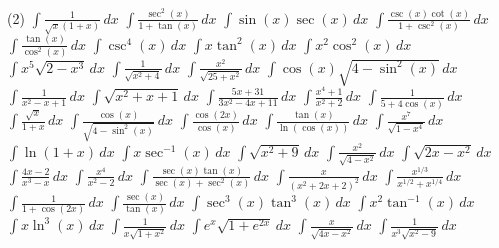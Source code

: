 \documentclass{article}
\begin{document}
\begin{tasks}[label=\arabic*., label-width=18pt](2)
  \task \( \displaystyle \int \frac{1}{\sqrt{x} (1 + x)} \, dx \)
  \task \( \displaystyle \int \frac{\sec^2(x)}{1 + \tan(x)} \, dx \)
  \task \( \displaystyle \int \sin(x) \sec(x) \, dx \)
  \task \( \displaystyle \int \frac{\csc(x) \cot(x)}{1 + \csc^2(x)} \, dx \)
  \task \( \displaystyle \int \frac{\tan(x)}{\cos^2(x)} \, dx \)
  \task \( \displaystyle \int \csc^4(x) \, dx \)
  \task \( \displaystyle \int x \tan^2(x) \, dx \)
  \task \( \displaystyle \int x^2 \cos^2(x) \, dx \)
  \task \( \displaystyle \int x^5 \sqrt{2 - x^3} \, dx \)
  \task \( \displaystyle \int \frac{1}{\sqrt{x^2 + 4}} \, dx \)
  \task \( \displaystyle \int \frac{x^2}{\sqrt{25 + x^2}} \, dx \)
  \task \( \displaystyle \int \cos(x) \sqrt{4 - \sin^2(x)} \, dx \)
  \task \( \displaystyle \int \frac{1}{x^2 - x + 1} \, dx \)
  \task \( \displaystyle \int \sqrt{x^2 + x + 1} \, dx \)
  \task \( \displaystyle \int \frac{5x + 31}{3x^2 - 4x + 11} \, dx \)
  \task \( \displaystyle \int \frac{x^4 + 1}{x^2 + 2} \, dx \)
  \task \( \displaystyle \int \frac{1}{5 + 4 \cos(x)} \, dx \)
  \task \( \displaystyle \int \frac{\sqrt{x}}{1 + x} \, dx \)
  \task \( \displaystyle \int \frac{\cos(x)}{\sqrt{4 - \sin^2(x)}} \, dx \)
  \task \( \displaystyle \int \frac{\cos(2x)}{\cos(x)} \, dx \)
  \task \( \displaystyle \int \frac{\tan(x)}{\ln(\cos(x))} \, dx \)
  \task \( \displaystyle \int \frac{x^7}{\sqrt{1 - x^4}} \, dx \)
  \task \( \displaystyle \int \ln(1 + x) \, dx \)
  \task \( \displaystyle \int x \sec^{-1}(x) \, dx \)
  \task \( \displaystyle \int \sqrt{x^2 + 9} \, dx \)
  \task \( \displaystyle \int \frac{x^2}{\sqrt{4 - x^2}} \, dx \)
  \task \( \displaystyle \int \sqrt{2x - x^2} \, dx \)
  \task \( \displaystyle \int \frac{4x - 2}{x^3 - x} \, dx \)
  \task \( \displaystyle \int \frac{x^4}{x^2 - 2} \, dx \)
  \task \( \displaystyle \int \frac{\sec(x) \tan(x)}{\sec(x) + \sec^2(x)} \, dx \)
  \task \( \displaystyle \int \frac{x}{(x^2 + 2x + 2)^2} \, dx \)
  \task \( \displaystyle \int \frac{x^{1/3}}{x^{1/2} + x^{1/4}} \, dx \)
  \task \( \displaystyle \int \frac{1}{1 + \cos(2x)} \, dx \)
  \task \( \displaystyle \int \frac{\sec(x)}{\tan(x)} \, dx \)
  \task \( \displaystyle \int \sec^3(x) \tan^3(x) \, dx \)
  \task \( \displaystyle \int x^2 \tan^{-1}(x) \, dx \)
  \task \( \displaystyle \int x \ln^3(x) \, dx \)
  \task \( \displaystyle \int \frac{1}{x \sqrt{1 + x^2}} \, dx \)
  \task \( \displaystyle \int e^x \sqrt{1 + e^{2x}} \, dx \)
  \task \( \displaystyle \int \frac{x}{\sqrt{4x - x^2}} \, dx \)
  \task \( \displaystyle \int \frac{1}{x^3 \sqrt{x^2 - 9}} \, dx \)

\end{tasks}
\end{document}

